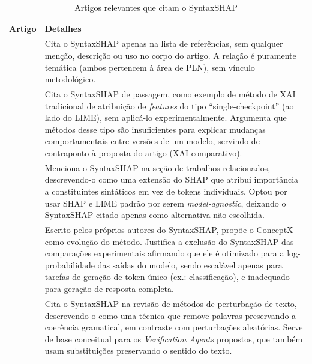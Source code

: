 \documentclass{article}
\begin{document}
\begin{table}[H]
    \centering
    \small
    \caption{Artigos relevantes que citam o SyntaxSHAP}
    \begin{tabularx}{\linewidth}{p{6cm} X}
        \toprule
        \textbf{Artigo} & \textbf{Detalhes} \\
        \midrule

        \textcite{li2026moeflowmatching} & Cita o SyntaxSHAP apenas na lista de referências, sem qualquer menção, descrição ou uso no corpo do artigo. A relação é puramente temática (ambos pertencem à área de PLN), sem vínculo metodológico. \\

        \textcite{ciaperoni2026comparing} & Cita o SyntaxSHAP de passagem, como exemplo de método de XAI tradicional de atribuição de \textit{features} do tipo ``single-checkpoint'' (ao lado do LIME), sem aplicá-lo experimentalmente. Argumenta que métodos desse tipo são insuficientes para explicar mudanças comportamentais entre versões de um modelo, servindo de contraponto à proposta do artigo (XAI comparativo). \\

        \textcite{mohammadi2025tokenreplacement} & Menciona o SyntaxSHAP na seção de trabalhos relacionados, descrevendo-o como uma extensão do SHAP que atribui importância a constituintes sintáticos em vez de tokens individuais. Optou por usar SHAP e LIME padrão por serem \textit{model-agnostic}, deixando o SyntaxSHAP citado apenas como alternativa não escolhida. \\

        \textcite{amara2025conceptlevel} & Escrito pelos próprios autores do SyntaxSHAP, propõe o ConceptX como evolução do método. Justifica a exclusão do SyntaxSHAP das comparações experimentais afirmando que ele é otimizado para a log-probabilidade das saídas do modelo, sendo escalável apenas para tarefas de geração de token único (ex.: classificação), e inadequado para geração de resposta completa. \\

        \textcite{yan2025explainablemapper} & Cita o SyntaxSHAP na revisão de métodos de perturbação de texto, descrevendo-o como uma técnica que remove palavras preservando a coerência gramatical, em contraste com perturbações aleatórias. Serve de base conceitual para os \textit{Verification Agents} propostos, que também usam substituições preservando o sentido do texto. \\

        \bottomrule
    \end{tabularx}
    \label{tab:syntaxshap-citacoes}
\end{table}
\end{document}
